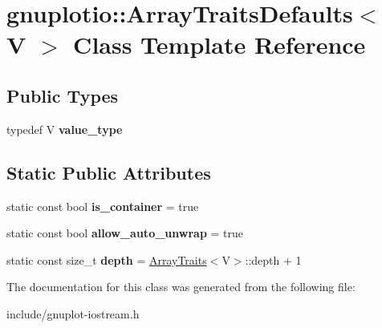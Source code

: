 \hypertarget{classgnuplotio_1_1ArrayTraitsDefaults}{}\section{gnuplotio\+:\+:Array\+Traits\+Defaults$<$ V $>$ Class Template Reference}
\label{classgnuplotio_1_1ArrayTraitsDefaults}
\subsection*{Public Types}
\begin{DoxyCompactItemize}
\item 
\mbox{\label{classgnuplotio_1_1ArrayTraitsDefaults_ad7a9e8d19419fabe2ab9cc1b76c9965b}} 
typedef V {\bfseries value\+\_\+type}
\end{DoxyCompactItemize}
\subsection*{Static Public Attributes}
\begin{DoxyCompactItemize}
\item 
\mbox{\label{classgnuplotio_1_1ArrayTraitsDefaults_a57bab5bf3617f0ee66fdd4dcb751aa21}} 
static const bool {\bfseries is\+\_\+container} = true
\item 
\mbox{\label{classgnuplotio_1_1ArrayTraitsDefaults_ac8d430cba6ceefc6f52706455f12a0e8}} 
static const bool {\bfseries allow\+\_\+auto\+\_\+unwrap} = true
\item 
\mbox{\label{classgnuplotio_1_1ArrayTraitsDefaults_ac51367f5da9096249b162af1496e36ab}} 
static const size\+\_\+t {\bfseries depth} = \hyperlink{classgnuplotio_1_1ArrayTraits}{Array\+Traits}$<$V$>$\+::depth + 1
\end{DoxyCompactItemize}


The documentation for this class was generated from the following file\+:\begin{DoxyCompactItemize}
\item 
include/gnuplot-\/iostream.\+h\end{DoxyCompactItemize}
